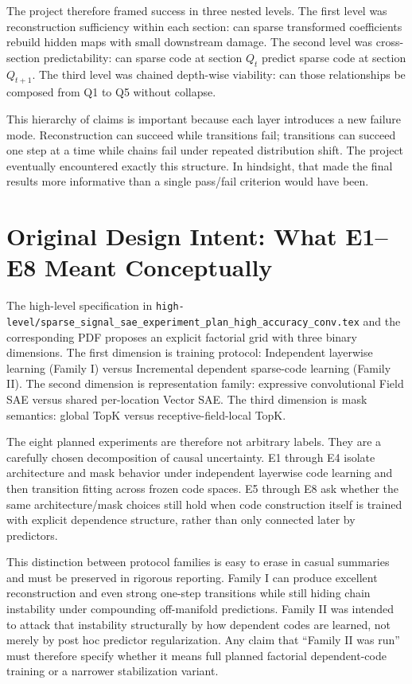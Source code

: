 \documentclass[11pt]{article}
\begin{document}
The project therefore framed success in three nested levels. The first level was reconstruction sufficiency within each section: can sparse transformed coefficients rebuild hidden maps with small downstream damage. The second level was cross-section predictability: can sparse code at section $Q_t$ predict sparse code at section $Q_{t+1}$. The third level was chained depth-wise viability: can those relationships be composed from Q1 to Q5 without collapse.

This hierarchy of claims is important because each layer introduces a new failure mode. Reconstruction can succeed while transitions fail; transitions can succeed one step at a time while chains fail under repeated distribution shift. The project eventually encountered exactly this structure. In hindsight, that made the final results more informative than a single pass/fail criterion would have been.

\section{Original Design Intent: What E1--E8 Meant Conceptually}
The high-level specification in \texttt{high-level/sparse\_signal\_sae\_experiment\_plan\_high\_accuracy\_conv.tex} and the corresponding PDF proposes an explicit factorial grid with three binary dimensions. The first dimension is training protocol: Independent layerwise learning (Family I) versus Incremental dependent sparse-code learning (Family II). The second dimension is representation family: expressive convolutional Field SAE versus shared per-location Vector SAE. The third dimension is mask semantics: global TopK versus receptive-field-local TopK.

The eight planned experiments are therefore not arbitrary labels. They are a carefully chosen decomposition of causal uncertainty. E1 through E4 isolate architecture and mask behavior under independent layerwise code learning and then transition fitting across frozen code spaces. E5 through E8 ask whether the same architecture/mask choices still hold when code construction itself is trained with explicit dependence structure, rather than only connected later by predictors.

This distinction between protocol families is easy to erase in casual summaries and must be preserved in rigorous reporting. Family I can produce excellent reconstruction and even strong one-step transitions while still hiding chain instability under compounding off-manifold predictions. Family II was intended to attack that instability structurally by how dependent codes are learned, not merely by post hoc predictor regularization. Any claim that ``Family II was run'' must therefore specify whether it means full planned factorial dependent-code training or a narrower stabilization variant.
\end{document}
